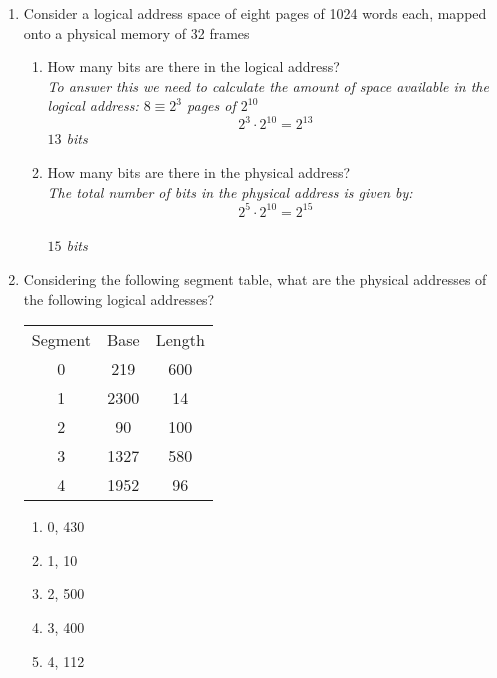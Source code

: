 \documentclass{article}
\newcommand{\answercolor}{Bittersweet}
\newcommand{\answer}[1]{{\\\color{\answercolor}\footnotesize\itshape{#1}}}
\begin{document}
\begin{enumerate}
\begin{enumerate}
		\end{enumerate}
		\item Consider a logical address space of eight pages of 1024 words each, mapped onto a physical memory of 32 frames
		\begin{enumerate}
			\item How many bits are there in the logical address?
            \answer{
                To answer this we need to calculate the amount of space available in the logical address:
                $8\equiv2^3$ pages of $2^{10}$
                \[2^3 \cdot 2^{10} = 2^{13}\]
                $13$ bits
            }
			\item How many bits are there in the physical address?
            \answer{
                The total number of bits in the physical address is given by:
                \[ 2^{5}\cdot2^{10}=2^{15}\]\\
                $15$ bits
            }
		\end{enumerate}
		\item Considering the following segment table, what are the physical addresses of the following logical addresses?
		\begin{table*}[h]
			\centering
			\begin{tabular}{ccc}
				Segment & Base & Length \\
				0       & 219  & 600    \\
				1       & 2300 & 14     \\
				2       & 90   & 100    \\
				3       & 1327 & 580    \\
				4       & 1952 & 96     \\
			\end{tabular}
		\end{table*}
		\begin{enumerate}
			\item 0, 430
			\item 1, 10
			\item 2, 500
			\item 3, 400
			\item 4, 112
		\end{enumerate}
	\end{enumerate}
\end{document}
